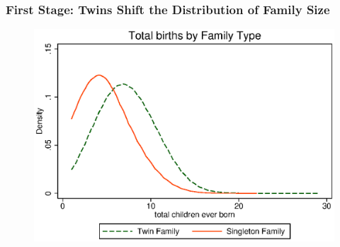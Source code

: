 \documentclass[9pt,letterpaper,subeqn]{beamer}
\begin{document}
\begin{frame}[label=FS1]
\frametitle{First Stage: Twins Shift the Distribution of Family Size}
\begin{figure}[htpb!]
\centering
  \includegraphics[scale=0.75]{./figures/famsize.eps}
\end{figure}
\hyperlink{Fstage}{}
\end{frame}



\begin{frame}[label=IV]

\hyperlink{Fstage2}{}
\end{frame}




\begin{frame}[label=USAIV]

\end{frame}

\end{document}
